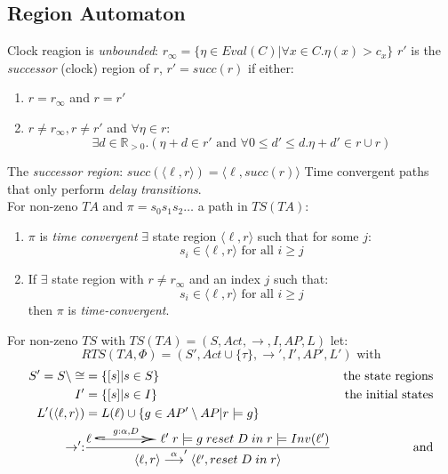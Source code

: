 \documentclass[a4paper, 10pt]{article}
\begin{document}
\subsection{Region Automaton}
\begin{mdframed}[roundcorner=5pt,
subtitlebelowline=false,subtitleaboveline=false,
subtitlebackgroundcolor=blue!30,
frametitlerule=true,
frametitlebackgroundcolor=blue!30,
frametitle={Unbounded Regions}
]
Clock reagion is \emph{unbounded}: $r_\infty=\{\eta\in Eval(C) | \forall x\in C.\eta(x)>c_x\}$
$r'$ is the \emph{successor} (clock) region of $r$, $r'=succ(r)$ if either:
\begin{enumerate}
    \item $r=r_\infty$ and $r=r'$
    \item $r\not=r_\infty,r\not=r'$ and $\forall\eta\in r$:
    \[ \exists d\in\mathds{R}_{>0}.(\eta+d\in r' \text{ and } \forall0\leq d'\leq d.\eta+d'\in r\cup r) \]
\end{enumerate}
The \emph{successor region}: $succ(\langle\ell,r\rangle) = \langle\ell,succ(r)\rangle$
Time convergent paths that only perform \emph{delay transitions}. \\
For non-zeno $TA$ and $\pi=s_0s_1s_2\dots$ a path in $TS(TA)$:
\begin{enumerate}
    \item $\pi$ is \emph{time convergent} \follows $\exists$ state region $\langle\ell,r\rangle$ such that for some $j$:
    \[ s_i\in\langle\ell,r\rangle \text{ for all } i\geq j \]
    \item If $\exists$ state region with $r\not=r_\infty$ and an index $j$ such that:
    \[ s_i\in\langle\ell,r\rangle \text{ for all } i\geq j \]
    then $\pi$ is \emph{time-convergent}.
\end{enumerate}
For non-zeno $TS$ with $TS(TA)=(S,Act,\to,I,AP,L)$ let:
\[ RTS(TA,\Phi)=(S',Act\cup\{\tau\},\to',I',AP',L') \text{ with} \]
\begin{align*}
S' = S\setminus\cong &= \{[s]|s\in S\} &\text{the state regions} \\
I'&=\{[s]|s\in I\} &\text{the initial states} \\
L'(\langle\ell,r\rangle) &= L(\ell)\cup \{g\in AP'\setminus AP |r\models g\} \\
\to' :& \frac{\ell \overset{g:\alpha,D}{\scalebox{5}[1]{$\hookrightarrow$}} \ell'\;r\models g\; reset\;D\;in\;r\models Inv(\ell')}{\langle\ell,r\rangle\overset{\alpha}{\longrightarrow}'\langle\ell',reset\;D\;in\;r\rangle} &\text{and} \\

\end{align*}
\end{mdframed}
\end{document}
